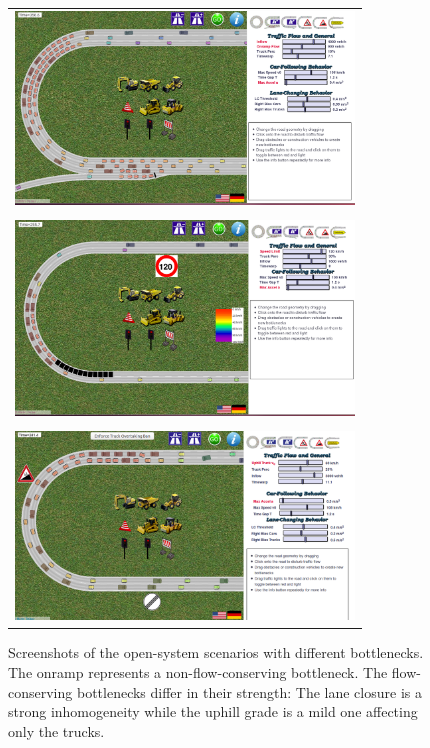 \documentclass[paper=A4,pagesize=auto,11pt]{scrartcl}
\begin{document}
\begin{figure}[!th]
\centering
\begin{tabular}{c}
  \includegraphics[width=90mm]{figs/screen_onramp.png} \\\\[1ex]
  \includegraphics[width=90mm]{figs/screen_roadworks.png} \\\\[1ex]
  \includegraphics[width=90mm]{figs/screen_uphill.png}\\
\end{tabular}

 \caption{\label{fig:openScenarios}Screenshots of the open-system scenarios with different bottlenecks. The onramp represents a non-flow-conserving bottleneck. The flow-conserving bottlenecks differ in their strength: The lane closure is a strong inhomogeneity while the uphill grade is a mild one affecting only the trucks.}

\end{figure}
\end{document}
